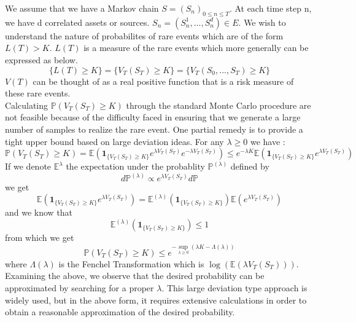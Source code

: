 We assume that we have a Markov chain $S=(S_n)_{0 \leq n \leq T}$. At each time step n, we have d correlated assets or sources. $S_n = (S_n^1,...,S_n^d) \in \mathit{E}$. We wish to understand the nature of probabilites of rare events which are of the form $L(T) > K$. $L(T)$ is a measure of the rare events which more generally can be expressed as below.
$$
\{L(T) \geq K\} = \{V_T(S_T)\geq K\} = \{V_T(S_0,...,S_T)\geq K\}
$$
$V(T)$ can be thought of as a real positive function that is a risk measure of these rare events.\\
Calculating $\mathbb{P}(V_T(S_T) \geq K)$ through the standard Monte Carlo procedure are not feasible because of the difficulty faced in ensuring that we generate a large number of samples to realize the rare event. One partial remedy is to provide a tight upper bound based on large deviation ideas. For any $\lambda \geq 0$ we have :
\begin{equation}
\mathbb{P}(V_T(S_T)\geq K) = \mathbb{E}\left( \mathbf{1}_{\{V_T(S_T)\geq K\}} e^{\lambda V_T(S_T)} e^{-\lambda V_T(S_T)} \right) \leq
e^{-\lambda K}\mathbb{E}\left( \mathbf{1}_{\{V_T(S_T)\geq K\}}e^{\lambda V_T(S_T)} \right)
\end{equation}
If we denote $\mathbb{E^{\lambda}}$ the expectation under the probablity $\mathbb{P}^{(\lambda)}$ defined by
$$d\mathbb{P}^{(\lambda)} \propto e^{\lambda V_T(S_T)}d\mathbb{P}$$
we get 
$$\mathbb{E}\left( \mathbf{1}_{\{V_T(S_T)\geq K\}}e^{\lambda V_T(S_T)}  \right) = \mathbb{E}^{(\lambda)}\left(\mathbf{1}_{\{V_T(S_T)\geq K\}}\right)\mathbb{E}\left(e^{\lambda V_T(S_T)}\right)$$
and we know that
$$\mathbb{E}^{(\lambda)}\left(\mathbf{1}_{\{V_T(S_T)\geq K\}}\right)\leq 1 $$
from which we get
\begin{equation}
\mathbb{P}\left(V_T(S_T) \geq K\right) \leq e^{-\sup_{\lambda\geq 0}(\lambda K - \Lambda(\lambda))}
\end{equation}
where $\Lambda(\lambda)$ is the Fenchel Transformation which is $\log (\mathbb{E}(\lambda V_T(S_T)))$.\\
Examining the above, we observe that the desired probability can be approximated by searching for a proper $\lambda$. This large deviation type approach is widely used, but in the above form, it requires extensive calculations in order to obtain a reasonable approximation of the desired probability.\\


